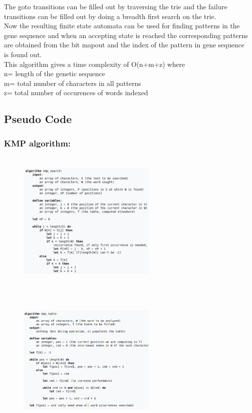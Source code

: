 \documentclass[a4paper,11pt,twocolumn]{article}
\begin{document}
The goto transitions can be filled out by traversing the trie and the failure transitions can be filled out by doing a breadth first search on the trie.\\
Now the resulting finite state automata can be used for finding patterns in the gene sequence and when an accepting state is reached the corresponding patterns are obtained from the bit map{out} and the index of the pattern in gene sequence is found out. \\
This algorithm gives a time complexity of O(n+m+z) where\\
n= length of the genetic sequence\\
m= total number of characters in all patterns\\
z= total number of occurences of words indexed
\subsection{Pseudo Code}
\subsubsection{KMP algorithm:}
\begin{figure}[H]
\includegraphics[width=6.8cm,height=7cm]{kmp}
\end{figure}

\begin{figure}[H]
\includegraphics[width=6.8cm,height=7cm]{table}
\end{figure} 
\end{document}
